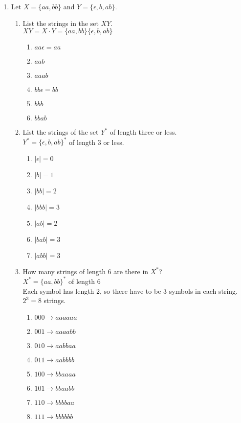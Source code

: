 \documentclass[10pt,a4paper,final]{article}
\begin{document}
\begin{enumerate}
\item %
Let $X = \{aa, bb\}$ and $Y = \{\epsilon, b, ab\}$.
\begin{enumerate}
  \item List the strings in the set $XY$.\\ %
  $XY = X \cdot Y = \{aa, bb\}\{\epsilon, b, ab\}$
  \begin{enumerate}
    \item $aa \epsilon = aa$
    \item $aa b$
    \item $aa ab$
    \item $bb \epsilon = bb$
    \item $bb b$
    \item $bb ab$
  \end{enumerate}
  \item List the strings of the set $Y^*$ of length three or less.\\
  $Y^* = \{\epsilon, b, ab\}^*$ of length 3 or less.
  \begin{enumerate}
  	\item $|\epsilon| = 0$
  	\item $|b| = 1$
  	\item $|b b| = 2$
  	\item $|b b b| = 3$
  	\item $|ab| = 2$
  	\item $|b ab| = 3$
  	\item $|ab b| = 3$
  \end{enumerate}
  \item How many strings of length 6 are there in $X^*$?\\
  $X^* = \{aa,bb\}^*$ of length 6\\
  Each symbol has length 2, so there have to be 3 symbols in each string. $2^3 = 8$ strings.
  \begin{enumerate}
  	\item $000 \rightarrow aa aa aa$
 	\item $001 \rightarrow aa aa bb$
  	\item $010 \rightarrow aa bb aa$
  	\item $011 \rightarrow aa bb bb$
  	\item $100 \rightarrow bb aa aa$
  	\item $101 \rightarrow bb aa bb$
  	\item $110 \rightarrow bb bb aa$
  	\item $111 \rightarrow bb bb bb$
  \end{enumerate}
\end{enumerate}


\end{enumerate}
\end{document}
